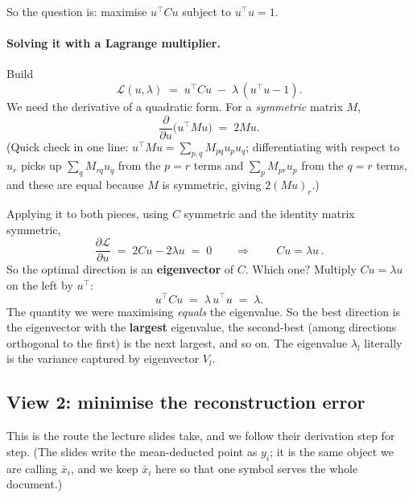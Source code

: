 \documentclass[11pt]{article}
\theoremstyle{definition}
\theoremstyle{remark}
\begin{document}
So the question is: maximise $u^{\!\top} C u$ subject to $u^{\!\top} u = 1$.

\paragraph{Solving it with a Lagrange multiplier.}
Build
\[
  \mathcal{L}(u,\lambda) \;=\; u^{\!\top} C u \;-\; \lambda\,(u^{\!\top} u - 1).
\]
We need the derivative of a quadratic form. For a \emph{symmetric} matrix $M$,
\[
  \frac{\partial}{\partial u}\bigl(u^{\!\top} M u\bigr) \;=\; 2Mu .
\]
(Quick check in one line: $u^{\!\top} M u=\sum_{p,q}M_{pq}u_pu_q$; differentiating
with respect to $u_r$ picks up $\sum_q M_{rq}u_q$ from the $p=r$ terms and
$\sum_p M_{pr}u_p$ from the $q=r$ terms, and these are equal because $M$ is
symmetric, giving $2(Mu)_r$.)

Applying it to both pieces, using $C$ symmetric and the identity matrix symmetric,
\[
  \frac{\partial \mathcal{L}}{\partial u} \;=\; 2Cu - 2\lambda u \;=\; 0
  \qquad\Longrightarrow\qquad
  \boxed{\,C u = \lambda u\,}.
\]
So the optimal direction is an \textbf{eigenvector} of $C$. Which one? Multiply
$Cu=\lambda u$ on the left by $u^{\!\top}$:
\[
  u^{\!\top} C u \;=\; \lambda\, u^{\!\top} u \;=\; \lambda .
\]
The quantity we were maximising \emph{equals} the eigenvalue. So the best direction
is the eigenvector with the \textbf{largest} eigenvalue, the second-best (among
directions orthogonal to the first) is the next largest, and so on. The eigenvalue
$\lambda_l$ literally is the variance captured by eigenvector $V_l$.

\subsection{View 2: minimise the reconstruction error}

This is the route the lecture slides take, and we follow their derivation step for
step. (The slides write the mean-deducted point as $y_i$; it is the same object we
are calling $\bar{x}_i$, and we keep $\bar{x}_i$ here so that one symbol serves the
whole document.)
\end{document}
